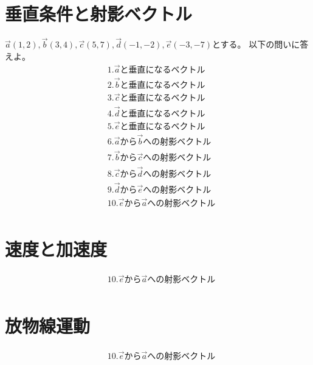 \documentclass[paper=b4j,landscape,twocolumn,fleqn]{jlreq}
\begin{document}
\section{垂直条件と射影ベクトル}  
$\vec{a}(1,2),　\vec{b}(3,4),　\vec{c}(5,7),　\vec{d}(-1,-2),　\vec{e}(-3,-7)$とする。
以下の問いに答えよ。\\
\begin{align*}
&1.\vec{a} と垂直になるベクトル\\
&2.\vec{b} と垂直になるベクトル\\
&3.\vec{c} と垂直になるベクトル\\
&4.\vec{d} と垂直になるベクトル\\
&5.\vec{e} と垂直になるベクトル\\
&6.\vec{a} から\vec{b}への射影ベクトル\\
&7.\vec{b} から\vec{c}への射影ベクトル\\
&8.\vec{c} から\vec{d}への射影ベクトル\\
&9.\vec{d} から\vec{e}への射影ベクトル\\
&10.\vec{e} から\vec{a}への射影ベクトル\\
\end{align*}

\newpage
\section{速度と加速度}
\begin{align*}
&10.\vec{e} から\vec{a}への射影ベクトル\\
\end{align*}
\section{放物線運動}
\begin{align*}
&10.\vec{e} から\vec{a}への射影ベクトル\\
\end{align*}
\end{document}
